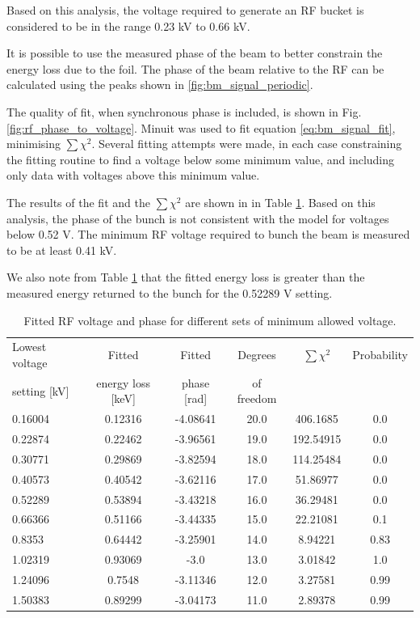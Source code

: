 \documentclass{paper}
\begin{document}
Based on this analysis, the voltage required to generate an RF bucket is 
considered to be in the range 0.23 kV to 0.66 kV.

It is possible to use the measured phase of the beam to better constrain the
energy loss due to the foil. The phase of the beam relative to the RF can be
calculated using the peaks shown in \ref{fig:bm_signal_periodic}.

The quality of fit, when synchronous phase is included, is shown in Fig.
\ref{fig:rf_phase_to_voltage}. Minuit was used to fit equation
\ref{eq:bm_signal_fit}, minimising $\sum \chi^2$. Several fitting attempts were
made, in each case constraining the fitting routine to find a voltage below some 
minimum value, and including only data with voltages above this minimum value.

The results of the fit and the $\sum \chi^2$ are shown in in Table 
\ref{tab:fitted_rf_voltage_and_phase}. Based on this analysis, the phase of the
bunch is not consistent with the model for voltages below 0.52 V. The minimum RF
voltage required to bunch the beam is measured to be at least 0.41 kV.

We also note from Table \ref{tab:fitted_rf_voltage_and_phase} that the fitted
energy loss is greater than the measured energy returned to the bunch for the
0.52289 V setting.

\begin{table}
\begin{center}
\begin{tabular}[\linewidth]{l|cc|cc|c}
Lowest voltage & Fitted & Fitted & Degrees & $\sum \chi^2$ & Probability \\
setting [kV] & energy loss [keV] & phase [rad] & of freedom &  &  \\
0.16004 & 0.12316 & -4.08641 & 20.0 & 406.1685 & 0.0 \\
0.22874 & 0.22462 & -3.96561 & 19.0 & 192.54915 & 0.0 \\
0.30771 & 0.29869 & -3.82594 & 18.0 & 114.25484 & 0.0 \\
0.40573 & 0.40542 & -3.62116 & 17.0 & 51.86977 & 0.0 \\
0.52289 & 0.53894 & -3.43218 & 16.0 & 36.29481 & 0.0 \\
0.66366 & 0.51166 & -3.44335 & 15.0 & 22.21081 & 0.1 \\
0.8353 & 0.64442 & -3.25901 & 14.0 & 8.94221 & 0.83 \\
1.02319 & 0.93069 & -3.0 & 13.0 & 3.01842 & 1.0 \\
1.24096 & 0.7548 & -3.11346 & 12.0 & 3.27581 & 0.99 \\
1.50383 & 0.89299 & -3.04173 & 11.0 & 2.89378 & 0.99 \\
\end{tabular}
\caption{Fitted RF voltage and phase for different sets of minimum allowed voltage.}
\label{tab:fitted_rf_voltage_and_phase}
\end{center}
\end{table}
\end{document}
